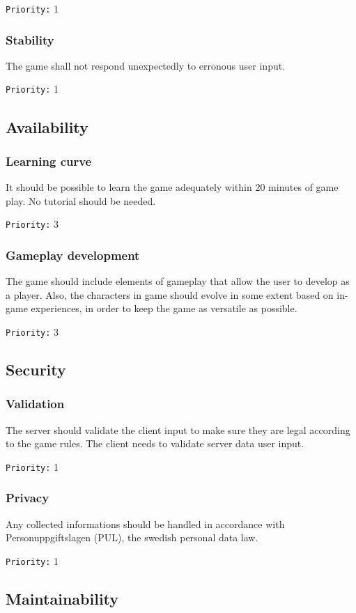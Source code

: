 \documentclass[a4paper,10pt]{article}
\newcommand{\prio}[1]{\texttt{Priority:} #1}
\begin{document}
\prio{1}

\subsubsection{Stability}
The game shall not respond unexpectedly to erronous user input.

\prio{1}

\subsection{Availability}
\subsubsection{Learning curve}
It should be possible to learn the game adequately within 20 minutes of game play. No tutorial should be needed.

\prio{3}

\subsubsection{Gameplay development}
The game should include elements of gameplay that allow the user to develop as a player. Also, the characters in game should evolve in some extent based on in-game experiences, in order to keep the game as versatile as possible.

\prio{3}

\subsection{Security}
\subsubsection{Validation}
\label{cheating}
The server should validate the client input to make sure they are legal according to the game rules. The client needs to validate server data user input. 

\prio{1}

\subsubsection{Privacy}
Any collected informations should be handled in accordance with Personuppgiftslagen (PUL), the swedish personal data law.

\prio{1}

\subsection{Maintainability}
\end{document}
